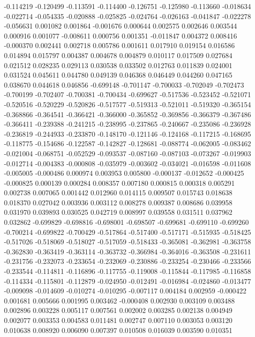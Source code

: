 -0.114219
-0.120499
-0.113591
-0.114400
-0.126751
-0.125980
-0.113660
-0.018634
-0.022714
-0.054335
-0.020888
-0.025825
-0.024764
-0.026163
-0.041847
-0.022278
-0.056631
0.001082
0.001864
-0.001676
0.000644
0.002575
0.002646
0.003544
0.000916
0.001077
-0.008611
0.000756
0.001351
-0.011847
0.004372
0.008416
-0.000370
0.002441
0.002718
0.005786
0.001611
0.017910
0.019154
0.016586
0.014894
0.015797
0.004387
0.004678
0.004879
0.010117
0.017509
0.027684
0.021512
0.028235
0.029113
0.030538
0.033502
0.012763
0.011839
0.024001
0.031524
0.045611
0.044780
0.049139
0.046368
0.046449
0.044260
0.047165
0.038670
0.044618
0.046856
-0.699148
-0.701147
-0.700033
-0.702049
-0.702473
-0.700199
-0.702407
-0.700381
-0.700434
-0.699627
-0.517536
-0.523452
-0.521071
-0.520516
-0.520229
-0.520826
-0.517577
-0.519313
-0.521011
-0.519320
-0.365154
-0.368866
-0.364541
-0.366421
-0.366000
-0.365852
-0.369856
-0.366379
-0.367486
-0.366411
-0.239388
-0.241215
-0.238995
-0.237865
-0.240667
-0.235086
-0.236928
-0.236819
-0.244933
-0.233870
-0.148170
-0.121146
-0.124168
-0.117215
-0.168695
-0.118775
-0.154686
-0.122587
-0.142827
-0.128681
-0.088774
-0.062005
-0.083462
-0.021004
-0.068751
-0.052529
-0.093537
-0.087160
-0.087103
-0.073267
-0.019903
-0.012714
-0.004383
-0.000808
-0.035979
-0.003602
-0.034021
-0.016598
-0.011608
-0.005005
-0.000486
0.000974
0.003953
0.005800
-0.000137
-0.012652
-0.000425
-0.000825
0.000139
0.000284
0.008357
0.007180
0.000815
0.000318
0.005291
0.002738
0.007065
0.001442
0.012960
0.014115
0.009507
0.015743
0.018638
0.018370
0.027042
0.003936
0.003112
0.008278
0.009387
0.008686
0.039958
0.031970
0.039893
0.030525
0.042719
0.008997
0.039558
0.031511
0.037962
0.032862
-0.699829
-0.698816
-0.698001
-0.698507
-0.699681
-0.699110
-0.699260
-0.700214
-0.699822
-0.700429
-0.517864
-0.517400
-0.517171
-0.515935
-0.518425
-0.517026
-0.518069
-0.518027
-0.517059
-0.518433
-0.365081
-0.362981
-0.363758
-0.362830
-0.363419
-0.363114
-0.363732
-0.366984
-0.364016
-0.363508
-0.231611
-0.231756
-0.232073
-0.233654
-0.232069
-0.230886
-0.233254
-0.230466
-0.233566
-0.233544
-0.114811
-0.116896
-0.117755
-0.119008
-0.115844
-0.117985
-0.116858
-0.114334
-0.115801
-0.112879
-0.024950
-0.012491
-0.016984
-0.024860
-0.013477
-0.009098
-0.014609
-0.010274
-0.010295
-0.007117
0.004184
0.002959
-0.000422
0.001681
0.005666
0.001995
0.003462
-0.000408
0.002930
0.003109
0.003488
0.002896
0.003228
0.005117
0.007561
0.002002
0.003285
0.002138
0.004949
0.002077
0.003353
0.004583
0.011481
0.002747
0.007110
0.003053
0.003120
0.010638
0.008920
0.006090
0.007397
0.010508
0.016039
0.003590
0.010351
